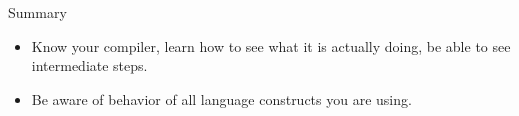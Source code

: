\begin{frame}{Summary}
    \begin{itemize}
        \item Know your compiler, learn how to see what it is actually doing, be able to see intermediate steps.
        \item Be aware of behavior of all language constructs you are using.
    \end{itemize}
\end{frame}


